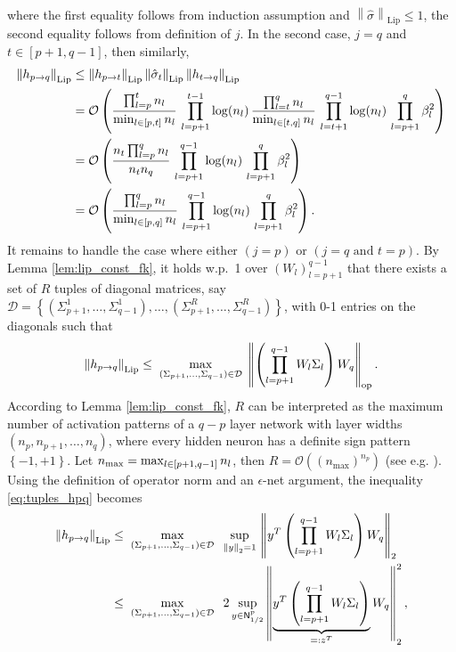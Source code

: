 \documentclass[11pt]{article}
\def\Set#1{\left\{ #1 \right\}}
\newcommand{\bigO}[1]{\mathcal{O}\left(#1\right)}
\newcommand{\norm}[1]{\left\|#1\right\|}
\def\Lip{\mathrm{Lip}}
\def\op{\mathrm{op}}
\def\min{\mathop{\rm min}\nolimits}
\def\max{\mathop{\rm max}\nolimits}
\begin{document}
    where the first equality follows from induction assumption and $\norm{\hat{\sigma}}_{\Lip}\leq 1$, 
    the second equality follows from definition of $j.$
    In the second case, $j=q$ and $t\in[p+1,q-1]$, then similarly,
    \begin{align*}
	\norm{h_{p\to q}}_{\Lip}
	&\leq \norm{h_{p\to t}}_{\Lip} \norm{\hat{\sigma}_{t}}_{\Lip} \norm{h_{t\to q}}_{\Lip} \\
	&=\bigO{ \frac{\prod_{l=p}^{t} n_l}{\min_{l\in[p,t]}n_l}\, \prod_{l=p+1}^{t-1}\log(n_l)\, \frac{\prod_{l=t}^q n_l}{\min_{l\in[t,q]}n_l}\, \prod_{l=t+1}^{q-1}\log(n_l)\, \prod_{l=p+1}^{q}\beta_l^2}\\
	&=\bigO{ \frac{n_t \prod_{l=p}^q n_l}{n_t n_q}\, \prod_{l=p+1}^{q-1}\log(n_l)\, \prod_{l=p+1}^{q}\beta_l^2 } \\
	&=\bigO{ \frac{\prod_{l=p}^q n_l}{\min_{l\in[p,q]}n_l}\, \prod_{l=p+1}^{q-1}\log(n_l)\, \prod_{l=p+1}^{q}\beta_l^2 }. 
    \end{align*}
    It remains to handle the case where either $(j=p)$ or $(j=q \textrm{ and } t=p)$. 
    By Lemma \ref{lem:lip_const_fk}, it holds w.p.\ 1 over $(W_l)_{l=p+1}^{q-1}$ that
    there exists a set of $R$ tuples of diagonal matrices, say $\mathcal{D}=\Set{(\Sigma_{p+1}^1,\ldots,\Sigma_{q-1}^1),\ldots,(\Sigma_{p+1}^R,\ldots,\Sigma_{q-1}^R)}$, 
    with 0-1 entries on the diagonals such that 
    \begin{align}\label{eq:tuples_hpq}
	\norm{h_{p\to q}}_{\Lip}
	\leq\; \max\limits_{(\Sigma_{p+1},\ldots,\Sigma_{q-1})\in\mathcal{D}}\; 
	\norm{ \left(\prod_{l=p+1}^{q-1} W_l\Sigma_l\right) W_q }_{\op} .
    \end{align}
    According to Lemma \ref{lem:lip_const_fk}, $R$ can be interpreted as the maximum number of activation patterns of a $q-p$ layer network with layer widths $(n_p,n_{p+1},\ldots,n_q)$,
    where every hidden neuron has a definite sign pattern $\Set{-1,+1}.$
    Let $n_{\mathrm{max}}=\max_{l\in[p+1,q-1]}n_l$, then $R=\bigO{(n_{\mathrm{max}})^{n_p}}$ (see e.g. \citep{HaninRolnick2019, SerraEtal2018}). 
    Using the definition of operator norm and an $\epsilon$-net argument, the inequality \eqref{eq:tuples_hpq} becomes
    \begin{align}\label{eq:scase_hpq}
	\norm{h_{p\to q}}_{\Lip}
	&\leq\; \max\limits_{(\Sigma_{p+1},\ldots,\Sigma_{q-1})\in\mathcal{D}}\;\; \sup_{\norm{y}_2=1}\, \norm{y^T \left(\prod_{l=p+1}^{q-1} W_l\Sigma_l\right) W_q }_{2} \nonumber\\
	&\leq\; \max\limits_{(\Sigma_{p+1},\ldots,\Sigma_{q-1})\in\mathcal{D}}\;\; 2\sup_{y\in{\sf N}_{1/2}^{p}} \norm{\underbrace{y^T \left(\prod_{l=p+1}^{q-1} W_l\Sigma_l\right)}_{=:z^T} W_q}_2^2,
    \end{align}
\end{document}

